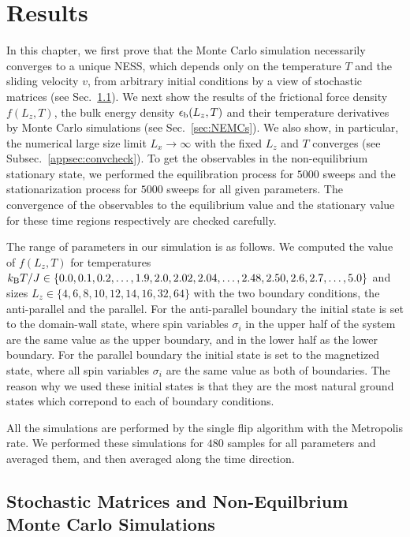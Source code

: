 \chapter{Results}

In this chapter, we first prove that the Monte Carlo simulation necessarily converges to a unique NESS, which depends only on the temperature $T$ and the sliding velocity $v$, from arbitrary initial conditions by a view of stochastic matrices (see Sec.~\ref{sec:StochMatNEMC}). We next show the results of the frictional force density $f(L_{z}, T)$, the bulk energy density $\epsilon_{\rm b}(L_{z}, T)$ and their temperature derivatives by Monte Carlo simulations (see Sec.~\ref{sec:NEMCs}). We also show, in particular, the numerical large size limit $L_{x}\to\infty$ with the fixed $L_{z}$ and $T$  converges (see Subsec.~\ref{appsec:convcheck}). To get the observables in the non-equilibrium stationary state, we performed the equilibration process for $5000$ sweeps and the stationarization process for $5000$ sweeps for all given parameters. The convergence of the observables to the equilibrium value and the stationary value for these time regions respectively are checked carefully.

The range of parameters in our simulation is as follows. We computed the value of $f(L_{z}, T)$ for temperatures $k_{\rm B}T/J\in\{0.0,0.1,0.2,\dots,1.9,2.0,2.02,2.04,\dots,2.48,2.50,2.6,2.7,\dots,5.0\}$ and sizes $L_{z}\in\{4,6,8,10,12,14,16,32,64\}$ with the two boundary conditions, the  anti-parallel and the parallel. For the anti-parallel boundary the initial state is set to the domain-wall state, where spin variables $\sigma_{i}$ in the upper half of the system are the same value as the upper boundary, and in the lower half as the lower boundary. For the parallel boundary the initial state is set to the magnetized state, where all spin variables $\sigma_{i}$ are the same value as both of boundaries. The reason why we used these initial states is that they are the most natural ground states which correpond to each of boundary conditions.

All the simulations are performed by the single flip algorithm with the Metropolis rate. We performed these simulations for $480$ samples for all parameters and averaged them, and then averaged along the time direction.

\section{Stochastic Matrices and Non-Equilbrium Monte Carlo Simulations}\label{sec:StochMatNEMC}

